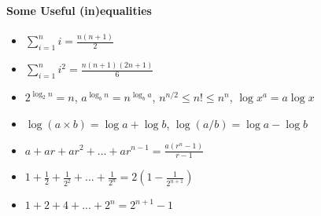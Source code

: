 \documentclass[12pt]{article}
\begin{document}
\paragraph{Some Useful (in)equalities}
\begin{itemize}
    \item $\sum_{i=1}^n i= \frac{n(n+1)}{2}$
    \item $\sum_{i=1}^ni^2 = \frac{n(n+1)(2n+1)}{6}$
    \item $2^{\log_2n}=n$, $a^{\log_bn}=n^{\log_ba}$, $n^{n/2}\leq n! \leq n^n$, $\log x^a = a\log x$
    \item $\log (a\times b) = \log a + \log b$, $\log(a/b) = \log a - \log b$
    \item $a + ar + ar^2 + ... + ar^{n-1} = \frac{a(r^n-1)}{r-1}$
    \item $1 + \frac{1}{2} + \frac{1}{2^2} + ... + \frac{1}{2^n} = 2(1-\frac{1}{2^{n+1}})$
    \item $1 + 2 + 4 + ... + 2^n = 2^{n+1}-1$
\end{itemize}



\end{document}

